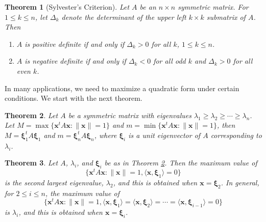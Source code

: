 \documentclass[12pt,letterpaper]{book}
\numberwithin{equation}{section}
\newtheorem{thm}{\textbf{Theorem}}[section]
\theoremstyle{definition}
\newcommand{\vx}{\bm{x}}
\newcommand{\vxi}{\bm{\xi}}
\begin{document}
\begin{thm}[Sylvester's Criterion]
Let $A$ be an $n\times n$ symmetric matrix. For $1\leq k \leq n$, let $\Delta_k$ denote the determinant of the upper left $k\times k$ submatrix of $A$. Then
\begin{enumerate}
\item $A$ is positive definite if and only if $\Delta_k>0$ for all $k$, $1\leq k \leq n$.
\item $A$ is negative definite if and only if $\Delta_k<0$ for all odd $k$ and $\Delta_k>0$ for all even $k$.
\end{enumerate}
\end{thm}

In many applications, we need to maximize a quadratic form under certain conditions. We start with the next theorem.

\begin{thm}\label{quad opt}
Let $A$ be a symmetric matrix with eigenvalues $\lambda_1\geq \lambda_2\geq \cdots \geq \lambda_n$. Let $M=\max\{\vx^t A\vx: \|\vx\|=1\}$ and $m=\min\{\vx^t A\vx: \|\vx\|=1\}$, then $M=\vxi_1^t A \vxi_1$ and $m=\vxi_n^t A\vxi_n$, where $\vxi_i$ is a unit eigenvector of $A$ corresponding to $\lambda_i$.
\end{thm}

\begin{thm}
Let $A$, $\lambda_i$, and $\vxi_i$ be as in Theorem \ref{quad opt}. Then the maximum value of $$\{\vx^t A\vx: \|\vx\|=1, \langle \vx,\vxi_1 \rangle=0\}$$ is the second largest eigenvalue, $\lambda_2$, and this is obtained when $\vx=\vxi_2$. In general, for $2\leq i \leq n$, the maximum value of $$\{\vx^t A\vx: \|\vx\|=1, \langle \vx,\vxi_1 \rangle=\langle \vx,\vxi_2 \rangle=\cdots =\langle \vx,\vxi_{i-1} \rangle=0\}$$ is $\lambda_i$, and this is obtained when $\vx=\vxi_i$.
\end{thm}
\end{document}
